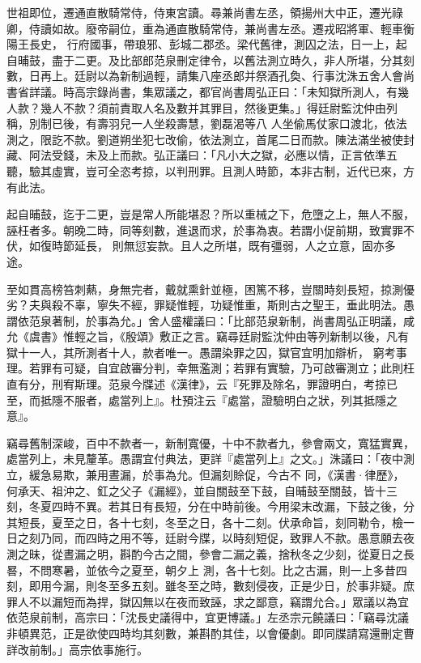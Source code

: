 \begin{pinyinscope}
 世祖即位，遷通直散騎常侍，侍東宮讀。尋兼尚書左丞，領揚州大中正，遷光祿卿，侍讀如故。廢帝嗣位，重為通直散騎常侍，兼尚書左丞。遷戎昭將軍、輕車衡陽王長史，
 行府國事，帶琅邪、彭城二郡丞。梁代舊律，測囚之法，日一上，起自晡鼓，盡于二更。及比部郎范泉刪定律令，以舊法測立時久，非人所堪，分其刻數，日再上。廷尉以為新制過輕，請集八座丞郎并祭酒孔奐、行事沈洙五舍人會尚書省詳議。時高宗錄尚書，集眾議之，都官尚書周弘正曰：「未知獄所測人，有幾人款？幾人不款？須前責取人名及數并其罪目，然後更集。」得廷尉監沈仲由列稱，別制已後，有壽羽兒一人坐殺壽慧，劉磊渴等八
 人坐偷馬仗家口渡北，依法測之，限訖不款。劉道朔坐犯七改偷，依法測立，首尾二日而款。陳法滿坐被使封藏、阿法受錢，未及上而款。弘正議曰：「凡小大之獄，必應以情，正言依準五聽，驗其虛實，豈可全恣考掠，以判刑罪。且測人時節，本非古制，近代已來，方有此法。



 起自晡鼓，迄于二更，豈是常人所能堪忍？所以重械之下，危墮之上，無人不服，誣枉者多。朝晚二時，同等刻數，進退而求，於事為衷。若謂小促前期，致實罪不伏，如復時節延長，
 則無愆妄款。且人之所堪，既有彊弱，人之立意，固亦多途。



 至如貫高榜笞刺爇，身無完者，戴就熏針並極，困篤不移，豈關時刻長短，掠測優劣？夫與殺不辜，寧失不經，罪疑惟輕，功疑惟重，斯則古之聖王，垂此明法。愚謂依范泉著制，於事為允。」舍人盛權議曰：「比部范泉新制，尚書周弘正明議，咸允《虞書》惟輕之旨，《殷頌》敷正之言。竊尋廷尉監沈仲由等列新制以後，凡有獄十一人，其所測者十人，款者唯一。愚謂染罪之囚，獄官宜明加辯析，
 窮考事理。若罪有可疑，自宜啟審分判，幸無濫測；若罪有實驗，乃可啟審測立；此則枉直有分，刑宥斯理。范泉今牒述《漢律》，云『死罪及除名，罪證明白，考掠已至，而抵隱不服者，處當列上』。杜預注云『處當，證驗明白之狀，列其抵隱之意』。



 竊尋舊制深峻，百中不款者一，新制寬優，十中不款者九，參會兩文，寬猛實異，處當列上，未見釐革。愚謂宜付典法，更詳『處當列上』之文。」洙議曰：「夜中測立，緩急易欺，兼用晝漏，於事為允。但漏刻賒促，今古不
 同，《漢書·律歷》，何承天、祖沖之、釭之父子《漏經》，並自關鼓至下鼓，自晡鼓至關鼓，皆十三刻，冬夏四時不異。若其日有長短，分在中時前後。今用梁末改漏，下鼓之後，分其短長，夏至之日，各十七刻，冬至之日，各十二刻。伏承命旨，刻同勒令，檢一日之刻乃同，而四時之用不等，廷尉今牒，以時刻短促，致罪人不款。愚意願去夜測之昧，從晝漏之明，斟酌今古之間，參會二漏之義，捨秋冬之少刻，從夏日之長晷，不問寒暑，並依今之夏至，朝夕上
 測，各十七刻。比之古漏，則一上多昔四刻，即用今漏，則冬至多五刻。雖冬至之時，數刻侵夜，正是少日，於事非疑。庶罪人不以漏短而為捍，獄囚無以在夜而致誣，求之鄙意，竊謂允合。」眾議以為宜依范泉前制，高宗曰：「沈長史議得中，宜更博議。」左丞宗元饒議曰：「竊尋沈議非頓異范，正是欲使四時均其刻數，兼斟酌其佳，以會優劇。即同牒請寫還刪定曹詳改前制。」高宗依事施行。




\end{pinyinscope}
